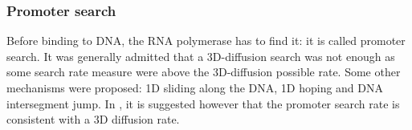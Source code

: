



\subsubsection{Promoter search} Before binding to DNA, the RNA polymerase has to find it: it is called promoter search. It was generally admitted that a 3D-diffusion search was not enough as some search rate measure were above the 3D-diffusion possible rate. Some other mechanisms were proposed: 1D sliding along the DNA, 1D hoping and DNA intersegment jump. In \citep{Hal:09}, it is suggested however that the promoter search rate is consistent with a 3D diffusion rate.



